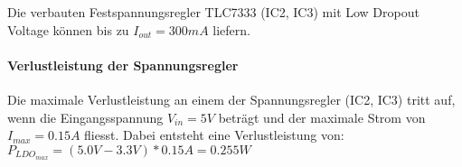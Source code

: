 Die verbauten Festspannungsregler TLC7333 (IC2, IC3) mit Low Dropout Voltage können bis zu ${I_{out}=300\si{mA}}$ liefern.

\paragraph{Verlustleistung der Spannungsregler}

Die maximale Verlustleistung an einem der Spannungsregler (IC2, IC3) tritt auf, wenn die Eingangsspannung ${V_{in}=5\si{V}}$ beträgt und der maximale Strom von ${I_{max}=0.15\si{A}}$ fliesst.
Dabei entsteht eine Verlustleistung von:\
\
${P_{LDO_{max}}=(5.0\si{V}-3.3\si{V})*0.15\si{A}}=0.255\si{W}$


